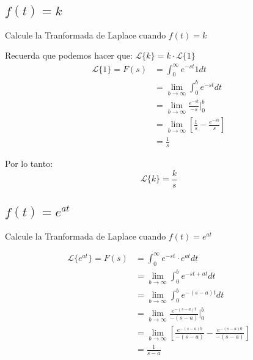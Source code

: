 \documentclass[12pt]{report}                                %
\begin{document}
        \subsection{$f(t) = k$}
            Calcule la Tranformada de Laplace cuando $f(t) = k$

            Recuerda que podemos hacer que: $\mathscr{L}\{k\} = k \cdot \mathscr{L}\{1\}$
            \begin{equation*}
            \begin{split}
                \mathscr{L}\{1\} = F(s) 
                            & = \int_0^\infty e^{-st} 1 dt                                              \\
                            & = \lim_{b \to \infty} \int_0^b e^{-st} dt                                 \\
                            & = \lim_{b \to \infty} \frac{e^{-st}}{-s} |_0^b                            \\
                            & = \lim_{b \to \infty} \left[ \frac{1}{s} - \frac{e^{-sb}}{s} \right]      \\
                            & = \frac{1}{s}
            \end{split}
            \end{equation*}

            Por lo tanto:
            \begin{equation}   
                \mathscr{L}\{k\} = \frac{k}{s}
            \end{equation}

        \subsection{$f(t) = e^{at}$}
            Calcule la Tranformada de Laplace cuando $f(t) = e^{at}$

            \begin{equation*}   
            \begin{split}
                \mathscr{L}\{e^{at}\}
                    = F(s) & = \int_0^\infty e^{-st} \cdot e^{at} dt                                                 \\
                    & = \lim_{b \to \infty} \int_0^b e^{-st+at} dt                                                   \\
                    & = \lim_{b \to \infty} \int_0^b e^{-(s-a)t} dt                                                  \\
                    & = \lim_{b \to \infty} \frac{e^{-(s-a)t}}{-(s-a)} |_0^b                                         \\
                    & = \lim_{b \to \infty} \left[ \frac{e^{-(s-a)b}}{-(s-a)} -  \frac{e^{-(s-a)0}}{-(s-a)} \right]  \\
                    & = \frac{1}{s-a}
            \end{split}
            \end{equation*}
\end{document}
